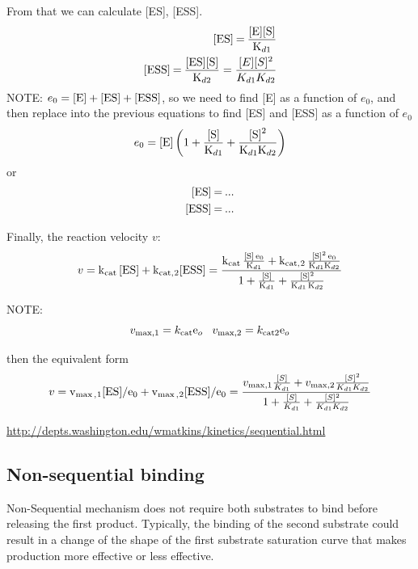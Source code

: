 From that we can calculate [ES],
[ESS].
\begin{equation}
\begin{split}
\ce{[ES] = \frac{[E][S]}{K_{d1}}  } \\
\ce{[ESS] = \frac{[ES][S]}{K_{d2}}} = \frac{[E][S]^2}{K_{d1}{K_{d2}}} 
\end{split}
\end{equation}
NOTE: $e_0 = \ce{[E] + [ES] + [ESS]}$, so we need to find [E] as a function of
$e_0$, and then replace into the previous equations to find [ES] and [ESS] as a
function of $e_0$
\begin{equation}
e_0 = \ce{[E]} \left( 1 + \ce{\frac{[S]}{K_{d1}} + \frac{[S]^2}{K_{d1}K_{d2}}}
\right)
\end{equation}
or
\begin{equation}
\begin{split}
\ce{[ES] =  ...   } \\
\ce{[ESS] =  ...   }
\end{split}
\end{equation}


Finally, the reaction velocity $v$:
\begin{equation}
v = \ce{ k_{cat} [ES] + k_{cat,2}[ESS] } =
\ce{ \frac{k_{cat} \frac{[S] e_0}{K_{d1}}  + k_{cat,2}
\frac{[S]^2 e_0}{K_{d1}K_{d2}} }{1 + \frac{[S]}{K_{d1}} +
\frac{[S]^2}{K_{d1} K_{d2}} } }
\end{equation}

NOTE:
\begin{equation}
v_{\max,1} = k_\text{cat} \ce{e_o} \;\;\;
v_{\max,2} = k_\text{cat2} \ce{e_o} 
\end{equation}

then the equivalent form
\begin{equation}
v = \ce{ v_{\max,1}[ES]/e_0 + v_{\max,2}[ESS]/e_0 } =
\frac{v_{\max,1} \frac{[S]}{K_{d1}}  + v_{\max,2} \frac{[S]^2}{K_{d1}K_{d2}} }
{1 + \frac{[S]}{K_{d1}} +\frac{[S]^2}{K_{d1} K_{d2}} }  
\end{equation}


\url{http://depts.washington.edu/wmatkins/kinetics/sequential.html}

\subsection{Non-sequential binding}

Non-Sequential mechanism does not require both substrates to bind before
releasing the first product. 
Typically, the binding of the second substrate could result
in a change of the shape of the first substrate saturation curve that makes
production more effective or less effective.

